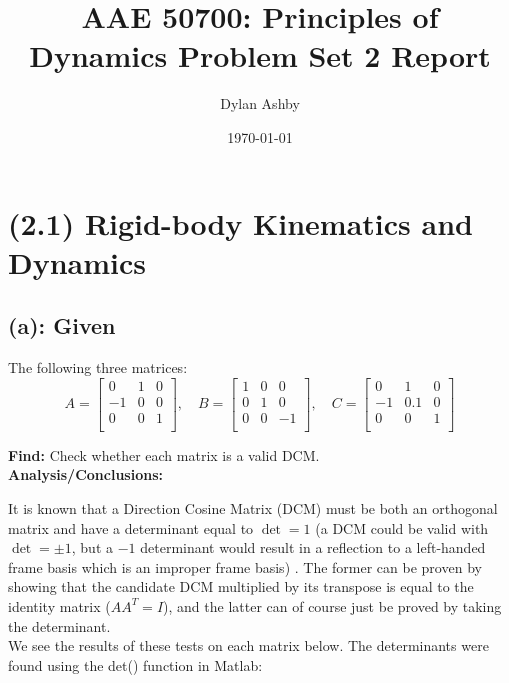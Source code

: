 \documentclass[titlepage]{article}
\title{AAE 50700: Principles of Dynamics Problem Set 2 Report}
\author{Dylan Ashby}
\date{\today}
\begin{document}
	
\maketitle
	
\section*{(2.1) Rigid-body Kinematics and Dynamics}
	
\subsection*{(a): Given}
The following three matrices:
\begin{equation}
	A=
	\begin{bmatrix}
		0 & 1 & 0 \\
		-1 & 0 & 0 \\
		0 & 0 & 1 \\
	\end{bmatrix},\quad B=
	\begin{bmatrix}
		1 & 0 & 0 \\
		0 & 1 & 0 \\
		0 & 0 & -1 \\
	\end{bmatrix},\quad C=
	\begin{bmatrix}
		0 & 1 & 0 \\
		-1 & 0.1 & 0 \\
		0 & 0 & 1 \\
	\end{bmatrix}
\end{equation} 
	
\textbf{Find:}
Check whether each matrix is a valid DCM.\\

\textbf{Analysis/Conclusions:}

It is known that a Direction Cosine Matrix (DCM) must be both an orthogonal matrix and have a determinant equal to $\det=1$ (a DCM could be valid with $\det=\pm 1$, but a $-1$ determinant would result in a reflection to a left-handed frame basis which is an improper frame basis) \cite{schaub_analytical_2018}. The former can be proven by showing that the candidate DCM multiplied by its transpose is equal to the identity matrix ($AA^T=I$), and the latter can of course just be proved by taking the determinant.\\

We see the results of these tests on each matrix below. The determinants were found using the det() function in Matlab:
\end{document}
